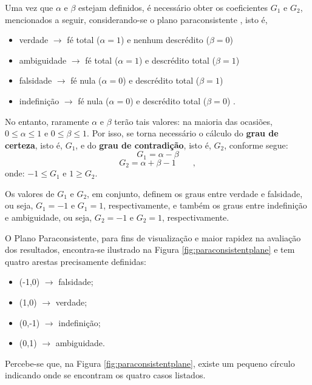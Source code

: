 			\par Uma vez que $\alpha$ e $\beta$ estejam definidos, é necessário obter os coeficientes $G_1$ e $G_2$, mencionados a seguir, considerando-se o plano paraconsistente \cite{8588433}, isto é,  
				
				\begin{itemize}
					\item verdade $\rightarrow$ fé total ($\alpha = 1$) e nenhum descrédito ($\beta = 0$)
					\item ambiguidade $\rightarrow$ fé total ($\alpha = 1$) e descrédito total ($\beta = 1$)
					\item falsidade $\rightarrow$ fé nula ($\alpha = 0$) e descrédito total ($\beta = 1$)
					\item indefinição $\rightarrow$ fé nula ($\alpha = 0$) e descrédito total ($\beta = 0$) \qquad.
				\end{itemize}
				
				\par No entanto, raramente $\alpha$ e $\beta$ terão tais valores: na maioria das ocasiões, $0 \leqslant \alpha \leqslant 1$ e $0 \leqslant \beta \leqslant 1$. Por isso, se torna necessário o cálculo do \textbf{grau de certeza}, isto é, $G_1$, e do \textbf{grau de contradição}, isto é, $G_2$, conforme segue:
				\begin{equation}
					G_1=\alpha-\beta 
				\end{equation}
				\begin{equation}
					G_2=\alpha+\beta-1 \qquad,
				\end{equation}
			onde: $-1 \leqslant G_1$ e  $1 \geqslant G_2$.

			\par Os valores de $G_1$ e $G_2$, em conjunto, definem os graus entre verdade e falsidade, ou seja, $G_1=-1$ e $G_1=1$, respectivamente, e também os graus entre indefinição e ambiguidade, ou seja, $G_2=-1$ e $G_2=1$, respectivamente.
		
			\par O Plano Paraconsistente, para fins de visualização e maior rapidez na avaliação dos resultados, encontra-se ilustrado na Figura \ref{fig:paraconsistentplane} e tem quatro arestas precisamente definidas:
			\begin{itemize}
				\item (-1,0) $\rightarrow$ falsidade;
				\item (1,0) $\rightarrow$ verdade;
				\item (0,-1) $\rightarrow$ indefinição;
				\item (0,1) $\rightarrow$ ambiguidade.
			\end{itemize}
			\par Percebe-se que, na Figura \ref{fig:paraconsistentplane}, existe um pequeno círculo indicando onde se encontram os quatro casos listados.
	
